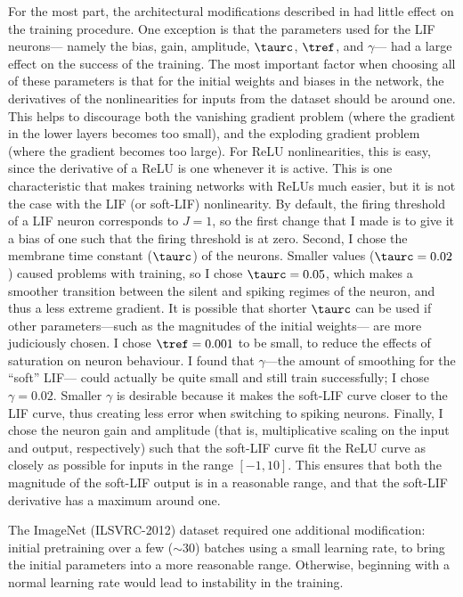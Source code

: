 For the most part,
the architectural modifications described in 
had little effect on the training procedure.
One exception is that the parameters used for the LIF neurons---%
namely the bias, gain, amplitude, $\taurc$, $\tref$, and $\gamma$---%
had a large effect on the success of the training.
The most important factor when choosing all of these parameters
is that for the initial weights and biases in the network,
the derivatives of the nonlinearities for inputs from the dataset
should be around one.
This helps to discourage both the vanishing gradient problem
(where the gradient in the lower layers becomes too small),
and the exploding gradient problem
(where the gradient becomes too large).
For ReLU nonlinearities, this is easy,
since the derivative of a ReLU is one whenever it is active.
This is one characteristic that makes training networks with ReLUs much easier,
but it is not the case with the LIF (or soft-LIF) nonlinearity.
By default, the firing threshold of a LIF neuron corresponds to $J = 1$,
so the first change that I made is to give it a bias of one
such that the firing threshold is at zero.
Second, I chose the membrane time constant ($\taurc$) of the neurons.
Smaller values ($\taurc = 0.02$) caused problems with training,
so I chose $\taurc = 0.05$,
which makes a smoother transition between the silent and spiking regimes
of the neuron, and thus a less extreme gradient.
It is possible that shorter $\taurc$ can be used
if other parameters---such as the magnitudes of the initial weights---%
are more judiciously chosen.
I chose $\tref = 0.001$ to be small,
to reduce the effects of saturation on neuron behaviour.
I found that $\gamma$---the amount of smoothing for the ``soft'' LIF---%
could actually be quite small and still train successfully;
I chose $\gamma = 0.02$.
Smaller $\gamma$ is desirable because it makes the soft-LIF curve
closer to the LIF curve,
thus creating less error when switching to spiking neurons.
Finally, I chose the neuron gain and amplitude
(that is, multiplicative scaling on the input and output, respectively)
such that the soft-LIF curve fit the ReLU curve as closely as possible
for inputs in the range $[-1, 10]$.
This ensures that both the magnitude of the soft-LIF output
is in a reasonable range,
and that the soft-LIF derivative has a maximum around one.

The ImageNet (ILSVRC-2012) dataset required one additional modification:
initial pretraining over a few ($\sim$30) batches using a small learning rate,
to bring the initial parameters into a more reasonable range.
Otherwise, beginning with a normal learning rate
would lead to instability in the training.


